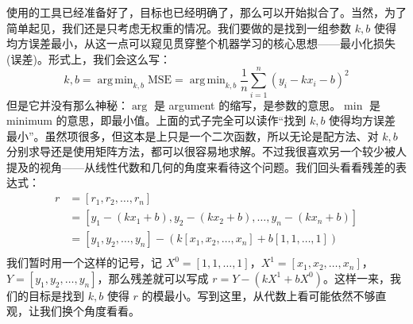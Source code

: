 \documentclass[UTF8, 12pt]{article}
\DeclareMathOperator*{\argmin}{arg\,min}
\begin{document}
使用的工具已经准备好了，目标也已经明确了，那么可以开始拟合了。当然，为了简单起见，我们还是只考虑无权重的情况。我们要做的是找到一组参数 $k, b$ 使得均方误差最小，从这一点可以窥见贯穿整个机器学习的核心思想——最小化损失(误差)。形式上，我们会这么写：
\[
    k, b = \argmin_{k, b} \text{MSE} = \argmin_{k, b} \frac1n \sum_{i=1}^n (y_i - kx_i - b)^2
\]
但是它并没有那么神秘：$\arg$ 是 argument 的缩写，是参数的意思。$\min$ 是 minimum 的意思，即最小值。上面的式子完全可以读作“找到 $k, b$ 使得均方误差最小”。虽然项很多，但这本是上只是一个二次函数，所以无论是配方法、对 $k, b$ 分别求导还是使用矩阵方法，都可以很容易地求解。不过我很喜欢另一个较少被人提及的视角——从线性代数和几何的角度来看待这个问题。我们回头看看残差的表达式：
\[
    \begin{aligned}
        r & = [r_1, r_2, \ldots, r_n]                                                     \\
          & = [y_1 - (kx_1 + b), y_2 - (kx_2 + b), \ldots, y_n - (kx_n + b)]              \\
          & = [y_1, y_2, \ldots, y_n] - (k [x_1, x_2, \ldots, x_n] + b [1, 1, \ldots, 1]) \\
    \end{aligned}
\]
我们暂时用一个这样的记号，记 $X^0 = [1, 1, \ldots, 1]$，$X^1 = [x_1, x_2, \ldots, x_n]$，$Y = [y_1, y_2, \ldots, y_n]$，那么残差就可以写成 $r = Y - (kX^1 + bX^0)$。这样一来，我们的目标是找到 $k, b$ 使得 $r$ 的模最小。写到这里，从代数上看可能依然不够直观，让我们换个角度看看。
\end{document}
